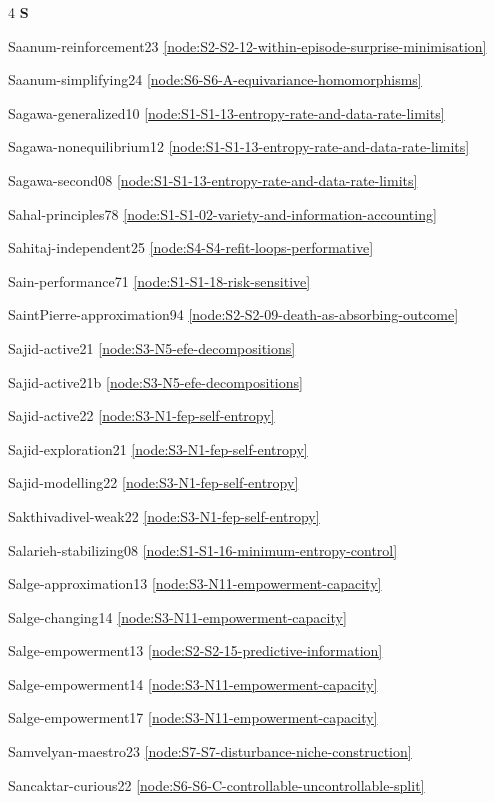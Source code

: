 \documentclass[10pt]{article}
\begin{document}
{\begin{multicols}{4}
\smallskip\textbf{S}\par
Saanum-reinforcement23 \hfill \ref{node:S2-S2-12-within-episode-surprise-minimisation}\par
Saanum-simplifying24 \hfill \ref{node:S6-S6-A-equivariance-homomorphisms}\par
Sagawa-generalized10 \hfill \ref{node:S1-S1-13-entropy-rate-and-data-rate-limits}\par
Sagawa-nonequilibrium12 \hfill \ref{node:S1-S1-13-entropy-rate-and-data-rate-limits}\par
Sagawa-second08 \hfill \ref{node:S1-S1-13-entropy-rate-and-data-rate-limits}\par
Sahal-principles78 \hfill \ref{node:S1-S1-02-variety-and-information-accounting}\par
Sahitaj-independent25 \hfill \ref{node:S4-S4-refit-loops-performative}\par
Sain-performance71 \hfill \ref{node:S1-S1-18-risk-sensitive}\par
SaintPierre-approximation94 \hfill \ref{node:S2-S2-09-death-as-absorbing-outcome}\par
Sajid-active21 \hfill \ref{node:S3-N5-efe-decompositions}\par
Sajid-active21b \hfill \ref{node:S3-N5-efe-decompositions}\par
Sajid-active22 \hfill \ref{node:S3-N1-fep-self-entropy}\par
Sajid-exploration21 \hfill \ref{node:S3-N1-fep-self-entropy}\par
Sajid-modelling22 \hfill \ref{node:S3-N1-fep-self-entropy}\par
Sakthivadivel-weak22 \hfill \ref{node:S3-N1-fep-self-entropy}\par
Salarieh-stabilizing08 \hfill \ref{node:S1-S1-16-minimum-entropy-control}\par
Salge-approximation13 \hfill \ref{node:S3-N11-empowerment-capacity}\par
Salge-changing14 \hfill \ref{node:S3-N11-empowerment-capacity}\par
Salge-empowerment13 \hfill \ref{node:S2-S2-15-predictive-information}\par
Salge-empowerment14 \hfill \ref{node:S3-N11-empowerment-capacity}\par
Salge-empowerment17 \hfill \ref{node:S3-N11-empowerment-capacity}\par
Samvelyan-maestro23 \hfill \ref{node:S7-S7-disturbance-niche-construction}\par
Sancaktar-curious22 \hfill \ref{node:S6-S6-C-controllable-uncontrollable-split}\par

\end{multicols}}
\end{document}
